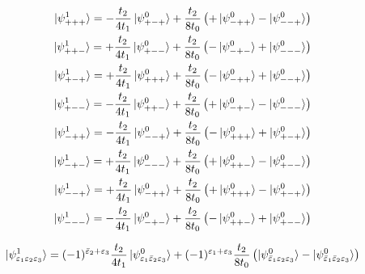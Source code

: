 \documentclass[11pt]{article}
\begin{document}
\begin{align}
	\ket{\psi^1_{+++}} = -\frac{t_2}{4 t_1} \ket{\psi^0_{+-+}} + \frac{t_2}{8 t_0}\left( +\ket{\psi^0_{-++}} - \ket{\psi^0_{--+}} \right) \\
	\ket{\psi^1_{++-}} = +\frac{t_2}{4 t_1} \ket{\psi^0_{+--}} + \frac{t_2}{8 t_0} \left( -\ket{\psi^0_{-+-}} + \ket{\psi^0_{---}} \right) \\
	\ket{\psi^1_{+-+}} = +\frac{t_2}{4 t_1} \ket{\psi^0_{+++}} +  \frac{t_2}{8 t_0} \left( -\ket{\psi^0_{-++}} + \ket{\psi^0_{--+}} \right) \\
	\ket{\psi^1_{+--}} = -\frac{t_2}{4 t_1} \ket{\psi^0_{++-}} +  \frac{t_2}{8 t_0} \left( +\ket{\psi^0_{-+-}} - \ket{\psi^0_{---}} \right) \\
	\ket{\psi^1_{-++}} = -\frac{t_2}{4 t_1} \ket{\psi^0_{--+}} + \frac{t_2}{8 t_0}\left( -\ket{\psi^0_{+++}} + \ket{\psi^0_{+-+}} \right) \\
	\ket{\psi^1_{-+-}} = +\frac{t_2}{4 t_1} \ket{\psi^0_{---}} + \frac{t_2}{8 t_0}\left( +\ket{\psi^0_{++-}} - \ket{\psi^0_{+--}} \right) \\
	\ket{\psi^1_{--+}} = +\frac{t_2}{4 t_1} \ket{\psi^0_{-++}} + \frac{t_2}{8 t_0}\left( +\ket{\psi^0_{+++}} - \ket{\psi^0_{+-+}} \right) \\
	\ket{\psi^1_{---}} = -\frac{t_2}{4 t_1} \ket{\psi^0_{-+-}} + \frac{t_2}{8 t_0}\left( -\ket{\psi^0_{++-}} + \ket{\psi^0_{+--}} \right)
\end{align}

\begin{equation}
	\ket{\psi^1_{\varepsilon_1 \varepsilon_2 \varepsilon_3}} = (-1)^{\bar{\varepsilon}_2 + \varepsilon_3} \frac{t_2}{4 t_1} \ket{\psi^0_{\varepsilon_1 \bar{\varepsilon}_2 \varepsilon_3}} + (-1)^{\varepsilon_1 + \varepsilon_3} \frac{t_2}{8 t_0} \left( \ket{\psi^0_{\bar{\varepsilon}_1 \varepsilon_2 \varepsilon_3}} - \ket{\psi^0_{\bar{\varepsilon}_1 \bar{\varepsilon}_2 \varepsilon_3}} \right)
\end{equation}
\end{document}
